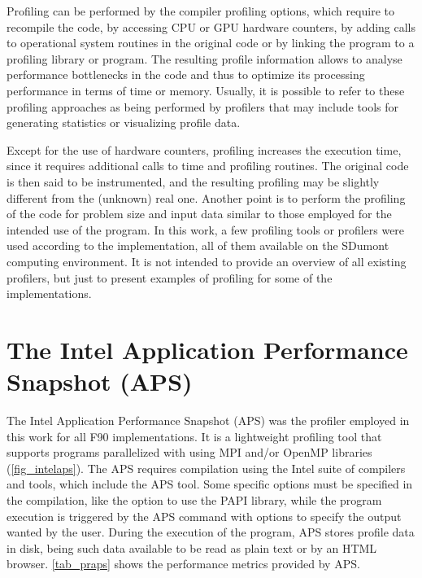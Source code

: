 Profiling can be performed by the compiler profiling options, which require to recompile the code, by accessing CPU or GPU hardware counters, by adding calls to operational system routines in the original code or by linking the program to a profiling library or program. The resulting profile information allows to analyse performance bottlenecks in the code and thus to optimize its processing performance in terms of time or memory. Usually, it is possible to refer to these profiling approaches as being performed by profilers that may include tools for generating statistics or visualizing profile data. 

Except for the use of hardware counters, profiling increases the execution time, since it requires additional calls to time and profiling routines. The original code is then said to be instrumented, and the resulting profiling may be slightly different from the (unknown) real one. Another point is to perform the profiling of the code for problem size and input data similar to those employed for the intended use of the program. In this work, a few profiling tools or profilers were used according to the implementation, all of them available on the SDumont computing environment. It is not intended to provide an overview of all existing profilers, but just to present examples of profiling for some of the implementations.

%
%
%
\section{The Intel Application Performance Snapshot (APS)}
\label{sec_tiap}

The Intel Application Performance Snapshot (APS) was the profiler employed in this work for all F90 implementations. It is a lightweight profiling tool that supports programs parallelized with using MPI and/or OpenMP libraries (\autoref {fig_intelaps}). The APS requires compilation using the Intel suite of compilers and tools, which include the APS tool. Some specific options must be specified in the compilation, like the option to use the PAPI library, while the program execution is triggered by the APS command with options to specify the output wanted by the user. During the execution of the program, APS stores profile data in disk, being such data available to be read as plain text or by an HTML browser. \autoref {tab_praps} shows the performance metrics provided by APS.

